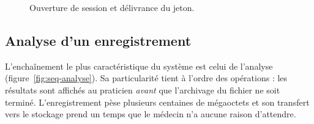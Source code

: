 \begin{figure}[H]
\centering
{}
\caption[Séquence d'authentification]%
        {Ouverture de session et délivrance du jeton.}
\label{fig:seq-auth}
\end{figure}

\subsection{Analyse d'un enregistrement}

L'enchaînement le plus caractéristique du système est celui de l'analyse
(figure~\ref{fig:seq-analyse}). Sa particularité tient à l'ordre des opérations :
les résultats sont affichés au praticien \emph{avant} que l'archivage du fichier ne
soit terminé. L'enregistrement pèse plusieurs centaines de mégaoctets et son transfert
vers le stockage prend un temps que le médecin n'a aucune raison d'attendre.


